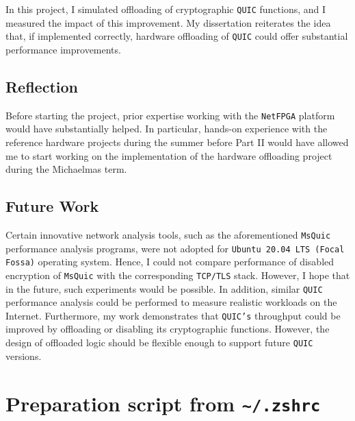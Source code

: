 \documentclass[12pt,a4paper]{report}
\newcommand\note[2]{{\color{#1}\bf #2}}
\newcommand\simon[1]{\ifcomments{\note{cyan}{SM: #1}}\fi}
\begin{document}
In this project, I simulated offloading of cryptographic \texttt{QUIC} functions, and I measured the impact of this improvement.
My dissertation reiterates the idea that, if implemented correctly, hardware offloading of \texttt{QUIC} could offer substantial performance improvements.


\section{Reflection}
Before starting the project, prior expertise working with the \texttt{NetFPGA} platform would have substantially helped.
In particular, hands-on experience with the reference hardware projects during the summer before Part II would have allowed me to start working on the implementation of the hardware offloading project during the Michaelmas term.


\section{Future Work}

Certain innovative network analysis tools, such as the aforementioned \texttt{MsQuic} performance analysis programs, were not adopted for \texttt{Ubuntu 20.04 LTS (Focal Fossa)} operating system.
Hence, I could not compare performance of disabled encryption of \texttt{MsQuic} with the corresponding \texttt{TCP/TLS} stack.
However, I hope that in the future, such experiments would be possible.
In addition, similar \texttt{QUIC} performance analysis could be performed to measure realistic workloads on the Internet.
Furthermore, my work demonstrates that \texttt{QUIC's} throughput could be improved by offloading or disabling its cryptographic functions.
However, the design of offloaded logic should be flexible enough to support future \texttt{QUIC} versions.



\appendix

\chapter{Preparation script from \texttt{\textasciitilde/.zshrc}} \label{preparation_script_from_zshrc}
\end{document}
